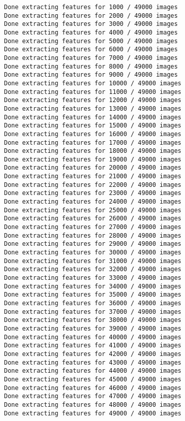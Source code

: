 \documentclass[11pt]{article}
\begin{document}
    \begin{Verbatim}[commandchars=\\\{\}]
Done extracting features for 1000 / 49000 images
Done extracting features for 2000 / 49000 images
Done extracting features for 3000 / 49000 images
Done extracting features for 4000 / 49000 images
Done extracting features for 5000 / 49000 images
Done extracting features for 6000 / 49000 images
Done extracting features for 7000 / 49000 images
Done extracting features for 8000 / 49000 images
Done extracting features for 9000 / 49000 images
Done extracting features for 10000 / 49000 images
Done extracting features for 11000 / 49000 images
Done extracting features for 12000 / 49000 images
Done extracting features for 13000 / 49000 images
Done extracting features for 14000 / 49000 images
Done extracting features for 15000 / 49000 images
Done extracting features for 16000 / 49000 images
Done extracting features for 17000 / 49000 images
Done extracting features for 18000 / 49000 images
Done extracting features for 19000 / 49000 images
Done extracting features for 20000 / 49000 images
Done extracting features for 21000 / 49000 images
Done extracting features for 22000 / 49000 images
Done extracting features for 23000 / 49000 images
Done extracting features for 24000 / 49000 images
Done extracting features for 25000 / 49000 images
Done extracting features for 26000 / 49000 images
Done extracting features for 27000 / 49000 images
Done extracting features for 28000 / 49000 images
Done extracting features for 29000 / 49000 images
Done extracting features for 30000 / 49000 images
Done extracting features for 31000 / 49000 images
Done extracting features for 32000 / 49000 images
Done extracting features for 33000 / 49000 images
Done extracting features for 34000 / 49000 images
Done extracting features for 35000 / 49000 images
Done extracting features for 36000 / 49000 images
Done extracting features for 37000 / 49000 images
Done extracting features for 38000 / 49000 images
Done extracting features for 39000 / 49000 images
Done extracting features for 40000 / 49000 images
Done extracting features for 41000 / 49000 images
Done extracting features for 42000 / 49000 images
Done extracting features for 43000 / 49000 images
Done extracting features for 44000 / 49000 images
Done extracting features for 45000 / 49000 images
Done extracting features for 46000 / 49000 images
Done extracting features for 47000 / 49000 images
Done extracting features for 48000 / 49000 images
Done extracting features for 49000 / 49000 images
    \end{Verbatim}
\end{document}
